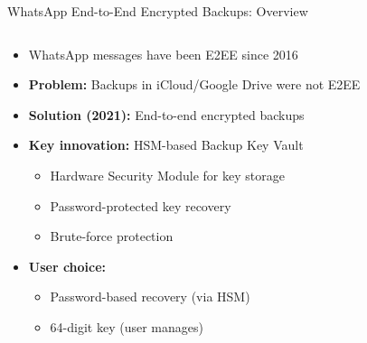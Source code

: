 \documentclass[aspectratio=169, lualatex, handout]{beamer}
\begin{document}
\begin{frame}{WhatsApp End-to-End Encrypted Backups: Overview}
	\begin{columns}[c]
		\begin{column}{0.75\textwidth}
			\begin{itemize}
				\item WhatsApp messages have been E2EE since 2016
				\item \textbf{Problem:} Backups in iCloud/Google Drive were not E2EE
				\item \textbf{Solution (2021):} End-to-end encrypted backups
				\item \textbf{Key innovation:} HSM-based Backup Key Vault
				      \begin{itemize}
					      \item Hardware Security Module for key storage
					      \item Password-protected key recovery
					      \item Brute-force protection
				      \end{itemize}
				\item \textbf{User choice:}
				      \begin{itemize}
					      \item Password-based recovery (via HSM)
					      \item 64-digit key (user manages)
				      \end{itemize}
			\end{itemize}
		\end{column}
		\begin{column}{0.25\textwidth}
		\end{column}
	\end{columns}
\end{frame}
\end{document}
